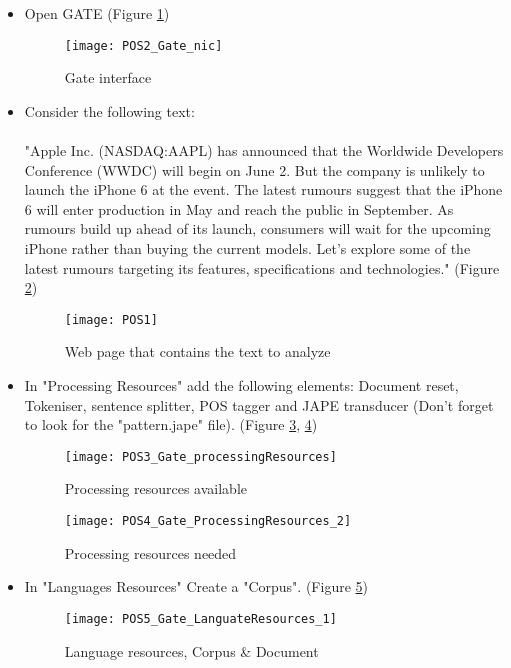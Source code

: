 	\begin{itemize}
		\item Open GATE (Figure \ref{fig:POS2})
		
			\begin{figure}\centering
				\texttt{[image: POS2\_Gate\_nic]}
				\caption{Gate interface}\label{fig:POS2}
			\end{figure}
		
		\item Consider the following text: \\\\"Apple Inc. (NASDAQ:AAPL) has announced that the Worldwide Developers Conference (WWDC) will begin on June 2. But the company is unlikely to launch the iPhone 6 at the event. The latest rumours suggest that the iPhone 6 will enter production in May and reach the public in September. As rumours build up ahead of its launch, consumers will wait for the upcoming iPhone rather than buying the current models. Let’s explore some of the latest rumours targeting its features, specifications and technologies." (Figure \ref{fig:POS1})
		
			\begin{figure}\centering
				\texttt{[image: POS1]}
				\caption{Web page that contains the text to analyze}\label{fig:POS1}
			\end{figure}
		
		\item In "Processing Resources" add the following elements: Document reset, Tokeniser, sentence splitter, POS tagger and JAPE transducer (Don't forget to look for the "pattern.jape" file). (Figure \ref{fig:POS3}, \ref{fig:POS4})
		
			\begin{figure}\centering
				\texttt{[image: POS3\_Gate\_processingResources]}
				\caption{Processing resources available}\label{fig:POS3}
			\end{figure}

			\begin{figure}\centering
				\texttt{[image: POS4\_Gate\_ProcessingResources\_2]}
				\caption{Processing resources needed}\label{fig:POS4}
			\end{figure}
		
		\item In "Languages Resources" Create a "Corpus". (Figure \ref{fig:POS5})
		
			\begin{figure}\centering
				\texttt{[image: POS5\_Gate\_LanguateResources\_1]}
				\caption{Language resources, Corpus \& Document}\label{fig:POS5}
			\end{figure}
		

\end{itemize}
